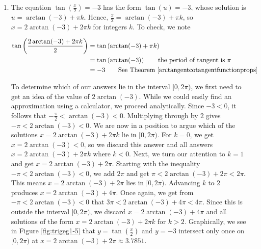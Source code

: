 {\begin{enumerate}
The same holds for the family $x =\frac{2\pi}{3} + \pi k$.  The solutions which lie in $[0,2\pi)$ come from the values $k = 0$ and $k=1$, namely $x = \frac{\pi}{3}$, $\frac{2\pi}{3}$, $\frac{4\pi}{3}$ and $\frac{5\pi}{3}$.  To confirm graphically, we simply plot $f(x)=\sec^2(x)$ in GeoGebra: see Figure \ref{fig:trigeg1-4}. (Again, if you're using a calculator, you'll probably have to rely on a reciprocal identity.) The $x$-coordinates of the intersection points of  $y = \frac{1}{(\cos(x))^2}$ and $y = 4$ verify our answers.


\item  The equation  $\tan\left(\frac{x}{2}\right) = -3$ has the form $\tan(u) = -3$, whose solution is $u = \arctan(-3) + \pi k$.  Hence, $\frac{x}{2} = \arctan(-3) + \pi k$, so  $x = 2\arctan(-3) + 2\pi k$ for integers $k$.  To check, we note

\noindent\hskip-25pt\begin{minipage}{\textwidth}
\begin{align*}
\tan\left(\frac{2\arctan(-3) + 2\pi k}{2}\right)  &  =  \tan\left( \arctan(-3) + \pi k \right)\\													& =   \tan\left(\arctan(-3) \right)  \tag*{the period of tangent is $\pi$} \\																		& =   -3  \tag*{See Theorem \ref{arctangentcotangentfunctionprops}}
\end{align*}
\end{minipage}

\medskip

 To determine which of our answers lie in the interval $[0,2\pi)$, we first need to get an idea of the value of $2\arctan(-3)$.  While we could easily find an approximation using a calculator, we proceed analytically.  Since $-3 < 0$, it follows that $-\frac{\pi}{2} < \arctan(-3) < 0$.  Multiplying through by $2$ gives $-\pi < 2\arctan(-3) < 0$.   We are now in a position to argue which of the solutions $x = 2\arctan(-3) + 2\pi k$ lie in $[0,2\pi)$.  For $k = 0$, we get $x = 2\arctan(-3) < 0$, so we discard this answer and all answers $x = 2\arctan(-3) + 2\pi k$ where $k < 0$.  Next, we turn our attention to $k = 1$ and get $x = 2\arctan(-3) + 2\pi$. Starting with the inequality $-\pi < 2\arctan(-3) < 0$, we add $2\pi$  and get $\pi < 2\arctan(-3) +2\pi < 2\pi$.  This means $x = 2\arctan(-3) + 2\pi$ lies in $[0,2\pi)$.  Advancing $k$ to $2$ produces $x = 2\arctan(-3) + 4\pi$. Once again, we get from $-\pi < 2\arctan(-3) < 0$ that $3\pi < 2\arctan(-3) + 4\pi < 4\pi$.  Since this is outside the interval $[0,2\pi)$,  we discard $x = 2\arctan(-3) + 4\pi$ and all solutions of the form $x = 2\arctan(-3) + 2\pi k$ for $k > 2$.   Graphically, we see in Figure \ref{fig:trigeg1-5} that $y = \tan\left(\frac{x}{2}\right)$ and $y = -3$ intersect only once on $[0,2\pi)$ at $x = 2\arctan(-3) + 2\pi\approx 3.7851$.


\end{enumerate}}
